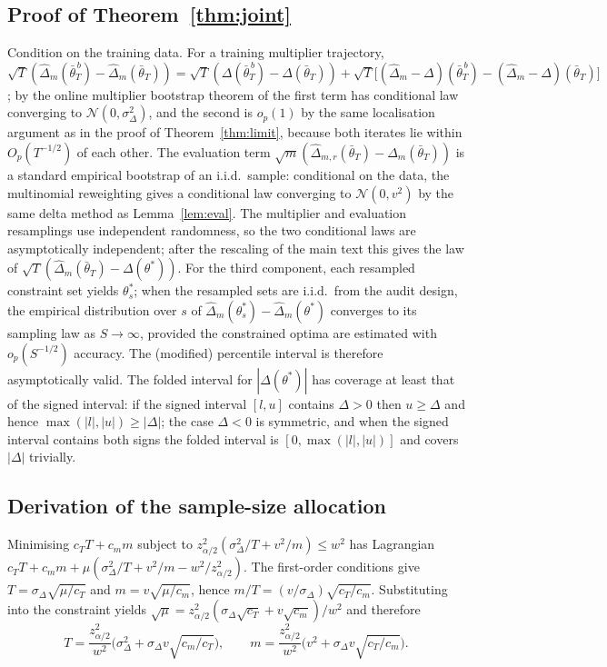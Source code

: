\documentclass[11pt]{article}
\newcommand{\dhat}{\hat\Delta}
\newcommand{\tbar}{\bar\theta}
\begin{document}
\subsection{Proof of Theorem~\ref{thm:joint}}
Condition on the training data.  For a training multiplier trajectory,
$\sqrt T(\dhat_m(\bar\theta_T^{\,b})-\dhat_m(\tbar_T))=\sqrt T(\Delta(\bar\theta_T^{\,b})-\Delta(\tbar_T))+\sqrt T\big[(\dhat_m-\Delta)(\bar\theta_T^{\,b})-(\dhat_m-\Delta)(\tbar_T)\big]$;
by the online multiplier bootstrap theorem of \citet{roy2026uq} the first term has conditional law
converging to $\mathcal N(0,\sigma^2_\Delta)$, and the second is $o_p(1)$ by the same localisation
argument as in the proof of Theorem~\ref{thm:limit}, because both iterates lie within
$O_p(T^{-1/2})$ of each other.  The evaluation term
$\sqrt m(\dhat_{m,r}(\tbar_T)-\dhat_m(\tbar_T))$ is a standard empirical bootstrap of an i.i.d.\
sample: conditional on the data, the multinomial reweighting gives a conditional law converging to
$\mathcal N(0,v^2)$ by the same delta method as Lemma~\ref{lem:eval}.  The multiplier and evaluation
resamplings use independent randomness, so the two conditional laws are asymptotically independent;
after the rescaling of the main text this gives the law of
$\sqrt T(\dhat_m(\tbar_T)-\Delta(\theta^*))$.  For the third component, each resampled constraint set
yields $\theta^*_s$; when the resampled sets are i.i.d.\ from the audit design, the empirical
distribution over $s$ of $\dhat_m(\theta^*_s)-\dhat_m(\theta^*)$ converges to its sampling law as
$S\to\infty$, provided the constrained optima are estimated with $o_p(S^{-1/2})$ accuracy.  The
(modified) percentile interval is therefore asymptotically valid.  The folded interval for
$|\Delta(\theta^*)|$ has coverage at least that of the signed interval: if the signed interval $[l,u]$
contains $\Delta>0$ then $u\ge\Delta$ and hence $\max(|l|,|u|)\ge|\Delta|$; the case $\Delta<0$ is
symmetric, and when the signed interval contains both signs the folded interval is $[0,\max(|l|,|u|)]$
and covers $|\Delta|$ trivially.

\subsection{Derivation of the sample-size allocation}
Minimising $c_T T+c_m m$ subject to $z^2_{\alpha/2}(\sigma^2_\Delta/T+v^2/m)\le w^2$ has Lagrangian
$c_T T+c_m m+\mu(\sigma^2_\Delta/T+v^2/m-w^2/z^2_{\alpha/2})$.  The first-order conditions give
$T=\sigma_\Delta\sqrt{\mu/c_T}$ and $m=v\sqrt{\mu/c_m}$, hence
$m/T=(v/\sigma_\Delta)\sqrt{c_T/c_m}$.  Substituting into the constraint yields
$\sqrt\mu=z^2_{\alpha/2}(\sigma_\Delta\sqrt{c_T}+v\sqrt{c_m})/w^2$ and therefore
\[
T=\frac{z^2_{\alpha/2}}{w^2}\Big(\sigma^2_\Delta+\sigma_\Delta v\sqrt{c_m/c_T}\Big),
\qquad
m=\frac{z^2_{\alpha/2}}{w^2}\Big(v^2+\sigma_\Delta v\sqrt{c_T/c_m}\Big).
\]
\end{document}
